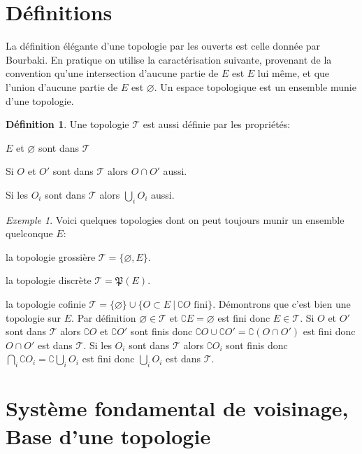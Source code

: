 \documentclass[a4paper, 11pt, french]{book}
\newenvironment{itemise}{\itemize}{\enditemize}
\theoremstyle{plain} %
\theoremstyle{definition} %
\newtheorem{definition}{Définition}
\theoremstyle{remark} %
\newtheorem{exemple}{Exemple}
\newcommand{\1}{\mathds{1}}
\newcommand\vide{\varnothing}
\newcommand\ens[2]{\{#1 \ |\ #2\}}
\begin{document}
\section{Définitions}

La définition élégante d'une topologie par les ouverts est celle donnée par Bourbaki.
En pratique on utilise la caractérisation suivante, provenant de la convention qu'une intersection d'aucune partie de $E$ est $E$ lui même, et que l'union d'aucune partie de $E$ est $\vide$.
Un espace topologique est un ensemble munie d'une topologie.

\begin{definition}
	Une topologie $\mathscr{T}$ est aussi définie par les propriétés:
	\begin{itemise}
		\item $E$ et $\vide$ sont dans $\mathscr{T}$
		\item Si $O$ et $O'$ sont dans $\mathscr{T}$ alors $O\cap O'$ aussi.
		\item Si les $O_i$ sont dans $\mathscr{T}$ alors $\bigcup_iO_i$ aussi.
	\end{itemise}
\end{definition}

\begin{exemple}
	Voici quelques topologies dont on peut toujours munir un ensemble quelconque $E$:
	\begin{itemise}
		\item la topologie grossière $\mathscr{T}=\{\vide, E\}$.
		\item la topologie discrète $\mathscr{T}=\mathfrak{P}(E)$.
		\item la topologie cofinie $\mathscr{T}=\{\vide\}\cup\ens{O\subset E}{\complement O\text{ fini}}$.
		Démontrons que c'est bien une topologie sur $E$.
		Par définition $\vide\in\mathscr{T}$ et $\complement E=\vide$ est fini donc $E\in\mathscr{T}$.
		Si $O$ et $O'$ sont dans $\mathscr{T}$ alors $\complement O$ et $\complement O'$ sont finis donc $\complement O\cup\complement O'=\complement(O\cap O')$ est fini donc $O\cap O'$ est dans $\mathscr{T}$.
		Si les $O_i$ sont dans $\mathscr{T}$ alors $\complement O_i$ sont finis donc $\bigcap_i\complement O_i=\complement\bigcup_iO_i$ est fini donc $\bigcup_iO_i$ est dans $\mathscr{T}$.
	\end{itemise}
\end{exemple}

\section{Système fondamental de voisinage, Base d'une topologie}
\end{document}
